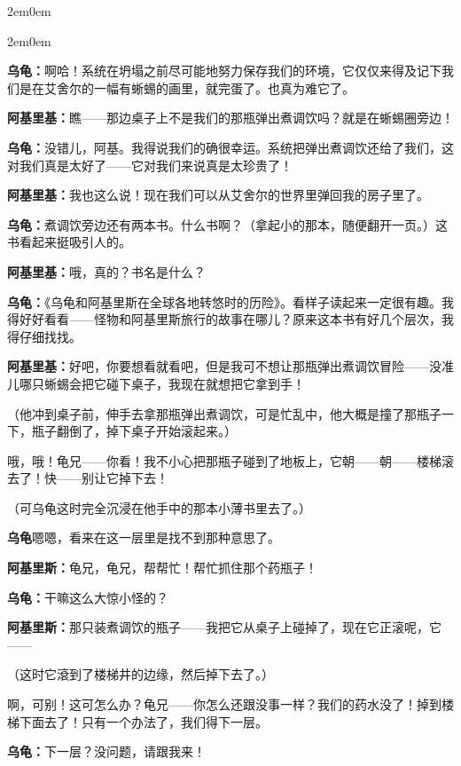\documentclass[
  12pt,
  twoside,
  openright,
  oldfontcommands,
]{memoir}
\newcommand{\kaitismall}[1]{{\kaitifamily\small #1}}
\newcommand{\dialogname}[1]{{\heifamily\bfseries #1}}
\begin{document}
\begin{adjustwidth}{2em}{0em}

\begin{adjustwidth}{2em}{0em}

\dialogname{乌龟：}啊哈！系统在坍塌之前尽可能地努力保存我们的环境，它仅仅来得及记下我们是在艾舍尔的一幅有蜥蜴的画里，就完蛋了。也真为难它了。

\dialogname{阿基里基：}瞧------那边桌子上不是我们的那瓶弹出煮调饮吗？就是在蜥蜴圈旁边！

\dialogname{乌龟：}没错儿，阿基。我得说我们的确很幸运。系统把弹出煮调饮还给了我们，这对我们真是太好了------它对我们来说真是太珍贵了！

\dialogname{阿基里基：}我也这么说！现在我们可以从艾舍尔的世界里弹回我的房子里了。

\dialogname{乌龟：}煮调饮旁边还有两本书。什么书啊？\kaitismall{（拿起小的那本，随便翻开一页。）}这书看起来挺吸引人的。

\dialogname{阿基里基：}哦，真的？书名是什么？

\dialogname{乌龟：}《乌龟和阿基里斯在全球各地转悠时的历险》。看样子读起来一定很有趣。我得好好看看------怪物和阿基里斯旅行的故事在哪儿？原来这本书有好几个层次，我得仔细找找。

\dialogname{阿基里基：}好吧，你要想看就看吧，但是我可不想让那瓶弹出煮调饮冒险------没准儿哪只蜥蜴会把它碰下桌子，我现在就想把它拿到手！

（他冲到桌子前，伸手去拿那瓶弹出煮调饮，可是忙乱中，他大概是撞了那瓶子一下，瓶子翻倒了，掉下桌子开始滚起来。）

哦，哦！龟兄------你看！我不小心把那瓶子碰到了地板上，它朝------朝------楼梯滚去了！快------别让它掉下去！

（可乌龟这时完全沉浸在他手中的那本小薄书里去了。）

\dialogname{乌龟}嗯嗯，看来在这一层里是找不到那种意思了。

\dialogname{阿基里斯：}龟兄，龟兄，帮帮忙！帮忙抓住那个药瓶子！

\dialogname{乌龟：}干嘛这么大惊小怪的？

\dialogname{阿基里斯：}那只装煮调饮的瓶子------我把它从桌子上碰掉了，现在它正滚呢，它------

（这时它滾到了楼梯井的边缘，然后掉下去了。）

啊，可别！这可怎么办？龟兄------你怎么还跟没事一样？我们的药水没了！掉到楼梯下面去了！只有一个办法了，我们得下一层。

\dialogname{乌龟：}下一层？没问题，请跟我来！


\end{adjustwidth}
\end{adjustwidth}
\end{document}
